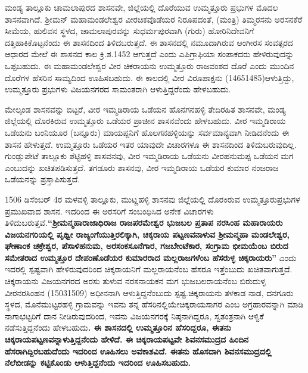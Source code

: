 ಮಂಡ್ಯ ತಾಲ್ಲೂಕು ಚಾಮಲಾಪುರದ ಶಾಸನವೇ, ಜಿಲ್ಲೆಯಲ್ಲಿ ದೊರೆಯುವ ಉಮ್ಮತ್ತೂರು ಪ್ರಭುಗಳ ಮೊದಲ ಶಾಸನವಾಗಿದೆ. ಶ‍್ರೀಮನ್​ ಮಹಾಮಂಡಲೇಶ್ವರ ವೀರಚಿಕವೊಡೆಯರ ನಿರೂಪದಂತೆ, (ಮಂತ್ರಿ) ತಿಮ್ಮರಸನು ಅರಸನಕೆರೆ ಸೀಮೆಯ, ಹುಲಿವನ ಸ್ಥಳದ, ಚಾಮಲಾಪುರವನ್ನು ಸುಧರ್ಮಪುರವಾಗಿ (ಗುರು) ಹೋರಿನಿದೇವನಿಗೆ ದತ್ತಿಹಾಕಿಕೊಟ್ಟನೆಂದು ಈ ಶಾಸನದಿಂದ ತಿಳಿದಬರುತ್ತದೆ. ಈ ಶಾಸನದಲ್ಲಿ ನಮೂದಾಗಿರುವ ಆಂಗೀರಸ ಸಂವತ್ಸರದ ಆಧಾರದ ಮೇಲೆ ಈ ಶಾಸನದ ಕಾಲ ಕ್ರಿ.ಶ.1452 ಆಗುತ್ತದೆ ಎಂದು ಎಪಿಗ್ರಾಫಿಯಾ ಸಂಪಾಕದರು ಹೇಳಿರುವುದನ್ನು ಒಪ್ಪಬಹುದು. ಈ ಮಹಾಮಂಡಲೇಶ್ವರ ವೀರ ಚಿಕರಾಯನು ಉಮ್ಮತ್ತೂರು ರಾಜವಂಶದ ದೊರೆ ಎಂದು ಮುಂದಿನ ದೊರೆಗಳ ಹೆಸರಿನ ಸಾಮ್ಯದಿಂದ ಊಹಿಸಬಹುದು. ಈ ಕಾಲದಲ್ಲಿ ವೀರ ವಿರೂಪಾಕ್ಷನು (1465\enginline{-}1485)ಆಳುತ್ತಿದ್ದು, ಉಮ್ಮತ್ತೂರು ಪ್ರಭುಗಳು ವಿಜಯನಗರದ ಸಾಮಂತರಾಗಿ ಆಳುತ್ತಿದ್ದರೆಂದು ಹೇಳಬಹುದು.

ಮೇಲ್ಕಂಡ ಶಾಸನವನ್ನು ಬಿಟ್ಟರೆ, ವೀರ ಇಮ್ಮಡಿರಾಯ ಒಡೆಯನ ಹೊನಗನಹಳ್ಳಿ ತೇದಿರಹಿತ ಶಾಸನವೇ, ಮಂಡ್ಯ ಜಿಲ್ಲೆಯಲ್ಲಿ ದೊರಕಿರುವ ಉಮ್ಮತ್ತೂರು ಒಡೆಯರ ಪ್ರಾಚೀನ ಶಾಸನವೆಂದು ಹೇಳಬಹುದು. ವೀರ ಇಮ್ಮಡಿರಾಯ ಒಡೆಯನು ಬಂನಿಯೂರ (ಬನ್ನೂರು) ಮಾಯಪ್ಪನಿಗೆ ಹೊಲಗನಹಳ್ಳಿಯನ್ನು ಸರ್ವಮಾನ್ಯವಾಗಿ ನೀಡಿದನೆಂದು ಈ ಶಾಸನ ಹೇಳುತ್ತದೆ. ಉಮ್ಮತ್ತೂರು ಒಡೆಯರ ಇತರ ಯಾವುದೇ ವಿಚಾರಗಳೂ ಈ ಶಾಸನದಿಂದ ತಿಳಿದುಬರುವುದಿಲ್ಲ. ಗುಂಡ್ಲುಪೇಟೆ ತಾಲ್ಲೂಕು ಶೆಟ್ಟಿಹಳ್ಳಿ ಶಾಸವನವು, ವೀರ ಇಮ್ಮಡಿರಾಯ ಒಡೆಯನು ವೀರಹನುಮಪ್ಪ ಒಡೆಯನ ಮಗ ಎಂಬುದನ್ನು ಖಚಿತಪಡಿಸುತ್ತದೆ. ತಗಡೂರು ಶಾಸನವು, ವೀರ ಇಮ್ಮಡಿರಾಯ ಒಡೆಯರ ಕುಮಾರ ನಂಜರಾಜ ಒಡೆಯನನ್ನು ಪ್ರಸ್ತಾಪಿಸುತ್ತದೆ.

1506 ಡಿಸೆಂಬರ್​ 4ರ ಮಳವಳ್ಳಿ ತಾಲ್ಲೂಕು, ಮುಟ್ಣಹಳ್ಳಿ ಶಾಸನವು ಜಿಲ್ಲೆಯಲ್ಲಿ ದೊರಕಿರುವ ಉಮ್ಮತ್ತೂರು\break ಪ್ರಭುಗಳ ಪ್ರಮುಖವಾದ ಶಾಸನ. ಇದರಿಂದ ಈ ಅರಸರಿಗೆ ಸಂಬಂಧಿಸಿದ ಅನೇಕ ವಿಚಾರಗಳು ತಿಳಿದುಬರುತ್ತವೆ.\break \textbf{“ಶ‍್ರೀಮನ್ಮಹಾರಾಜಾಧಿರಾಜ ರಾಜಪರಮೇಶ್ವರ ಭುಜಬಲ ಪ್ರತಾಪ ನರಸಿಂಹ ಮಹಾರಾಯರು ವಿಜಯನಗರಿಯಲ್ಲಿ ಪೃಥ್ವೀ ರಾಜ್ಯಂಗೆಯುತ್ತಿರಲಿಕ್ಕಾಗಿ, ಚಿಕ್ಕರಾಯ ಪಟ್ಟಣವನಾಳುವ ಶ‍್ರೀಮನ್ಮಹಾ ಮಂಡಲೇಶ್ವರ, ಘೇಣಾಂಕ ಚಕ್ರೇಶ್ವರ, ಪೆಸಾಳಿಹನುಮ, ಅರಸಂಕಸೂನೆಗಾರ, ಗಜಬೇಂಟೆಕಾರ, ಸಂಗ್ರಾಮ ಭೀಮಯೆಂಬ ಬಿರುದ ಸಮೇತರಾದ ಉಮ್ಮತ್ತೂರ ದೇಪಂಣೊಡೆಯರ ಕುಮಾರರಾದ ಮಲ್ಲರಾಜಗಳೆಂಬ ಹೆಸರುಳ್ಳ ಚಿಕ್ಕರಾಯರು” }ಎಂದು ಇದರಲ್ಲಿ ಸ್ಪಷ್ಟವಾಗಿ ಹೇಳಿರುವುದರಿಂದ ಚಿಕ್ಕರಾಯನಿಗೆ ಮಲ್ಲರಾಯನೆಂಬ ಹೆಸರೂ ಇತ್ತೆಂಬುದು ಖಚಿತವಾಗುತ್ತದೆ. ಚಿಕ್ಕರಾಯನು ವಿಜಯನಗರದ ಅರಸು ತುಳುವ ನರಸನಾಯಕನ ಮಗ ಭುಜಬಲರಾಯನೆಂಬ ಬಿರುದುಳ್ಳ ವೀರನರಸಿಂಹನ (1503\enginline{-}1509) ಅಧೀನನಾಗಿ ಆಳುತ್ತಿದ್ದನೆಂಬುದು ಸ್ಪಷ್ಟ.\break ಚಿಕ್ಕರಾಯನು ತಳಕಾಡ ನಾಡ, ದನಗೂರು ಸ್ಥಳದ, ಮೊನೆಮುಟ್ಟರಹಳ್ಳಿ ಗ್ರಾಮವನ್ನು ಇವನು ತನ್ನ ಹೆಸರಿನಲ್ಲಿಯೇ\break ಚಿಕ್ಕರಾಯಸಾಗರ ಎಂಬ ಅಗ್ರಹಾರವನ್ನಾಗಿ ಮಾಡಿ ನಾಗಾಭಟ್ಟರಿಗೆ ದಾನ ನೀಡಿರುವುದರಿಂದ, ಇವನು ವಿಜಯನಗರಕ್ಕೆ ನಿಷ್ಠನಾಗಿದ್ದರೂ, ಸ್ವತಂತ್ರನಾಗಿ ಆಳ್ವಿಕೆ ನಡೆಸುತ್ತಿದ್ದನೆಂದು ಹೇಳಬಹುದು\textbf{. ಈ ಶಾಸನದಲ್ಲಿ ಉಮ್ಮತ್ತೂರಿನ ಹೆಸರಿದ್ದರೂ, ಈತನು ಚಿಕ್ಕರಾಯಪಟ್ಟಣವನ್ನಾಳುತ್ತಿದ್ದನೆಂದು ಹೇಳಿದೆ. ಈ ಚಿಕ್ಕರಾಯಪಟ್ಟವೇ ಶಿವನಸಮುದ್ರದ ಹಿಂದಿನ ಹೆಸರಾಗಿದ್ದಿರಬಹುದೆಂದು ಇದರಿಂದ ಊಹಿಸಲು ಅವಕಾಶವಿದೆ. ಈತನು ಹೊಸದಾಗಿ ಶಿವನಸಮುದ್ರದಲ್ಲಿ ನೆಲೆಬೀಡನ್ನು ಕಟ್ಟಿಕೊಂಡು ಆಳುತ್ತಿದ್ದನೆಂದು ಇದರಿಂದ ಊಹಿಸಬಹುದು. }

